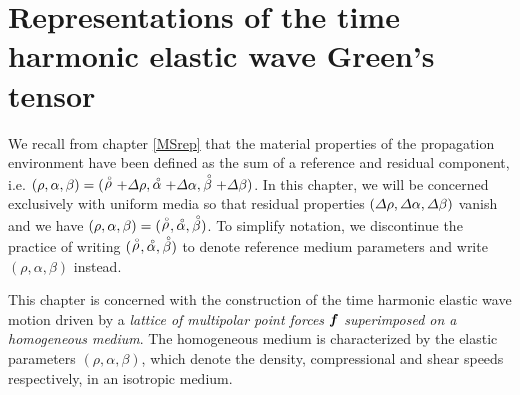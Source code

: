 \chapter{Representations of the time harmonic elastic wave Green's 
tensor}\label{Grep}
We recall from chapter \ref{MSrep} that
 the material 
properties of the propagation environment have been defined as  
the sum of a reference and residual component, i.e.
$(\rho, \alpha, \beta)=(\stackrel{\scriptscriptstyle _{\,\,\circ}}{ \rho}+{\mit \Delta}\rho,\stackrel{\scriptscriptstyle _{\,\,\circ}}{ \alpha}+{\mit 
\Delta}\alpha,\stackrel{\scriptscriptstyle _{\,\,\circ}}{ \beta}+{\mit \Delta}\beta)$. In this chapter, we will 
be concerned exclusively with uniform media so that 
residual properties $({\mit \Delta}\rho,{\mit 
\Delta}\alpha,{\mit \Delta}\beta)$ vanish and we have
$(\rho, \alpha, \beta)=(\stackrel{\scriptscriptstyle _{\,\,\circ}}{ \rho},\stackrel{\scriptscriptstyle _{\,\,\circ}}{ \alpha},\stackrel{\scriptscriptstyle _{\,\,\circ}}{ \beta})$. To simplify 
notation, we discontinue the practice of writing  $(\stackrel{\scriptscriptstyle _{\,\,\circ}}{ \rho},\stackrel{\scriptscriptstyle _{\,\,\circ}}{ \alpha},\stackrel{\scriptscriptstyle _{\,\,\circ}}{ \beta})$
to denote reference medium parameters and write 
$({\rho},{\alpha},{\beta})$ instead.

This chapter is concerned with the construction of the time harmonic 
elastic wave motion driven by a {\em lattice of multipolar point forces\/} 
${\mbox{\boldmath$\mit f$\unboldmath}}$ {\em  superimposed on a homogeneous medium\/}.
The homogeneous medium is
characterized by the  elastic parameters $(\rho,\alpha,\beta)$, which 
denote the density, compressional and shear speeds respectively, in an 
isotropic medium. 


